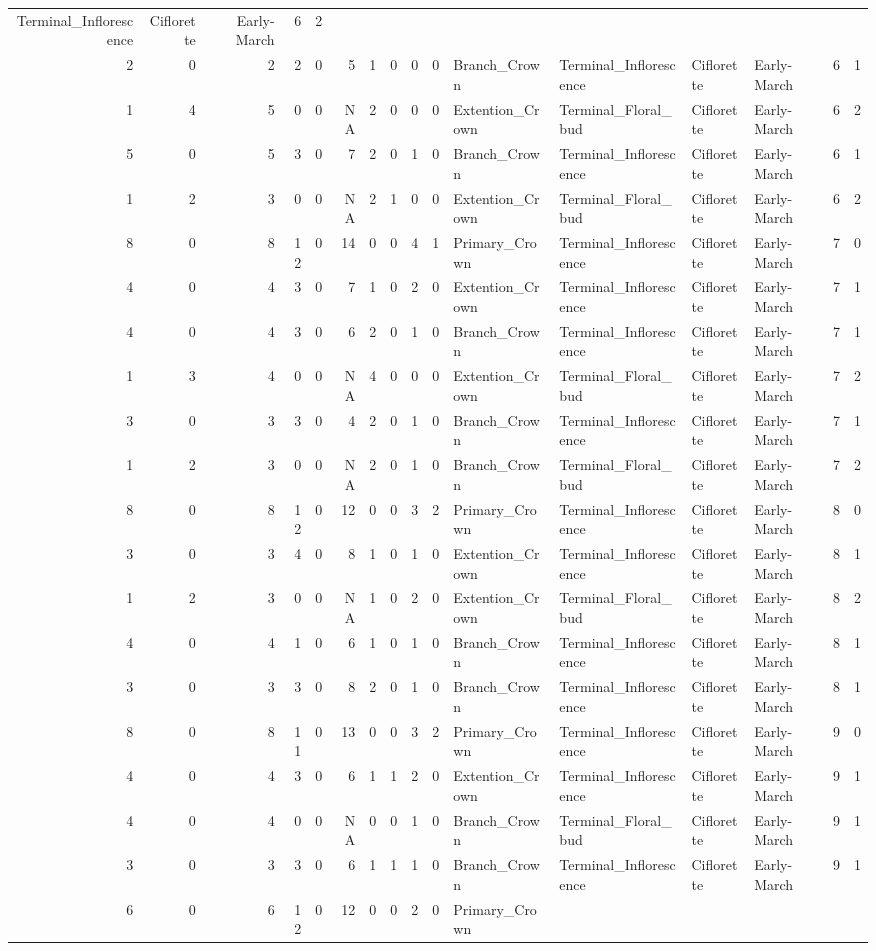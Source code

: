 \documentclass[]{article}
\begin{document}
\begin{longtable}[]{@{}rrrrrrrrrrllllrl@{}}
Terminal\_Inflorescence & Ciflorette & Early-March & 6 &
2\tabularnewline
2 & 0 & 2 & 2 & 0 & 5 & 1 & 0 & 0 & 0 & Branch\_Crown &
Terminal\_Inflorescence & Ciflorette & Early-March & 6 &
1\tabularnewline
1 & 4 & 5 & 0 & 0 & NA & 2 & 0 & 0 & 0 & Extention\_Crown &
Terminal\_Floral\_bud & Ciflorette & Early-March & 6 & 2\tabularnewline
5 & 0 & 5 & 3 & 0 & 7 & 2 & 0 & 1 & 0 & Branch\_Crown &
Terminal\_Inflorescence & Ciflorette & Early-March & 6 &
1\tabularnewline
1 & 2 & 3 & 0 & 0 & NA & 2 & 1 & 0 & 0 & Extention\_Crown &
Terminal\_Floral\_bud & Ciflorette & Early-March & 6 & 2\tabularnewline
8 & 0 & 8 & 12 & 0 & 14 & 0 & 0 & 4 & 1 & Primary\_Crown &
Terminal\_Inflorescence & Ciflorette & Early-March & 7 &
0\tabularnewline
4 & 0 & 4 & 3 & 0 & 7 & 1 & 0 & 2 & 0 & Extention\_Crown &
Terminal\_Inflorescence & Ciflorette & Early-March & 7 &
1\tabularnewline
4 & 0 & 4 & 3 & 0 & 6 & 2 & 0 & 1 & 0 & Branch\_Crown &
Terminal\_Inflorescence & Ciflorette & Early-March & 7 &
1\tabularnewline
1 & 3 & 4 & 0 & 0 & NA & 4 & 0 & 0 & 0 & Extention\_Crown &
Terminal\_Floral\_bud & Ciflorette & Early-March & 7 & 2\tabularnewline
3 & 0 & 3 & 3 & 0 & 4 & 2 & 0 & 1 & 0 & Branch\_Crown &
Terminal\_Inflorescence & Ciflorette & Early-March & 7 &
1\tabularnewline
1 & 2 & 3 & 0 & 0 & NA & 2 & 0 & 1 & 0 & Branch\_Crown &
Terminal\_Floral\_bud & Ciflorette & Early-March & 7 & 2\tabularnewline
8 & 0 & 8 & 12 & 0 & 12 & 0 & 0 & 3 & 2 & Primary\_Crown &
Terminal\_Inflorescence & Ciflorette & Early-March & 8 &
0\tabularnewline
3 & 0 & 3 & 4 & 0 & 8 & 1 & 0 & 1 & 0 & Extention\_Crown &
Terminal\_Inflorescence & Ciflorette & Early-March & 8 &
1\tabularnewline
1 & 2 & 3 & 0 & 0 & NA & 1 & 0 & 2 & 0 & Extention\_Crown &
Terminal\_Floral\_bud & Ciflorette & Early-March & 8 & 2\tabularnewline
4 & 0 & 4 & 1 & 0 & 6 & 1 & 0 & 1 & 0 & Branch\_Crown &
Terminal\_Inflorescence & Ciflorette & Early-March & 8 &
1\tabularnewline
3 & 0 & 3 & 3 & 0 & 8 & 2 & 0 & 1 & 0 & Branch\_Crown &
Terminal\_Inflorescence & Ciflorette & Early-March & 8 &
1\tabularnewline
8 & 0 & 8 & 11 & 0 & 13 & 0 & 0 & 3 & 2 & Primary\_Crown &
Terminal\_Inflorescence & Ciflorette & Early-March & 9 &
0\tabularnewline
4 & 0 & 4 & 3 & 0 & 6 & 1 & 1 & 2 & 0 & Extention\_Crown &
Terminal\_Inflorescence & Ciflorette & Early-March & 9 &
1\tabularnewline
4 & 0 & 4 & 0 & 0 & NA & 0 & 0 & 1 & 0 & Branch\_Crown &
Terminal\_Floral\_bud & Ciflorette & Early-March & 9 & 1\tabularnewline
3 & 0 & 3 & 3 & 0 & 6 & 1 & 1 & 1 & 0 & Branch\_Crown &
Terminal\_Inflorescence & Ciflorette & Early-March & 9 &
1\tabularnewline
6 & 0 & 6 & 12 & 0 & 12 & 0 & 0 & 2 & 0 & Primary\_Crown &

\end{longtable}
\end{document}
